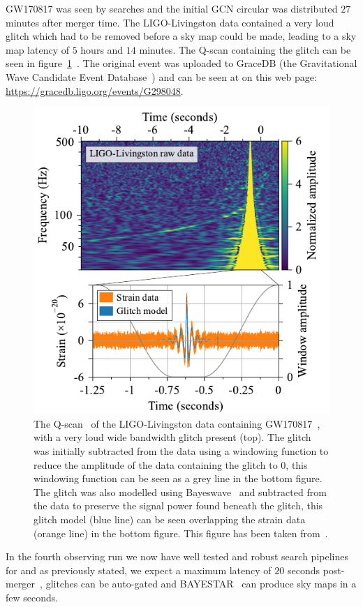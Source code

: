 GW170817 was seen by \gwadj searches and the initial GCN circular was distributed $27$ minutes after merger time. The LIGO-Livingston data contained a very loud glitch which had to be removed before a sky map could be made, leading to a sky map latency of $5$ hours and $14$ minutes. The Q-scan containing the glitch can be seen in figure~\ref{6:fig:gw170817_glitch}~\cite{GW170817:2017}. The original event was uploaded to GraceDB (the Gravitational Wave Candidate Event Database~\cite{ligo_gracedb:2024}) and can be seen at on this web page: \href{https://gracedb.ligo.org/events/G298048}{https://gracedb.ligo.org/events/G298048}.
%
\begin{figure}
    \centering
    \includegraphics[width=1.0\linewidth]{images/6_earlywarning/gw170817/GW170817_glitch_subtraction.pdf}
    \caption{The Q-scan~\cite{qscan:2004} of the LIGO-Livingston data containing GW170817~\cite{GW170817:2017}, with a very loud wide bandwidth glitch present (top). The glitch was initially subtracted from the data using a windowing function to reduce the amplitude of the data containing the glitch to $0$, this windowing function can be seen as a grey line in the bottom figure. The glitch was also modelled using Bayeswave~\cite{BayesWave:2015} and subtracted from the data to preserve the \gwadj signal power found beneath the glitch, this glitch model (blue line) can be seen overlapping the strain data (orange line) in the bottom figure. This figure has been taken from~\cite{GW170817:2017}.}
    \label{6:fig:gw170817_glitch}
\end{figure}
%
In the fourth observing run we now have well tested and robust search pipelines for \gws and as previously stated, we expect a maximum latency of $20$ seconds post-merger~\cite{PyCBC_Live:2018}, glitches can be auto-gated and BAYESTAR~\cite{BAYESTAR:2016} can produce sky maps in a few seconds.

